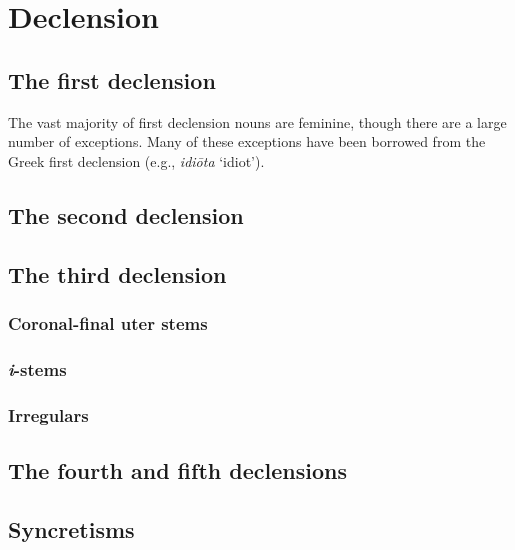 \chapter{Declension}

\section{The first declension}

The vast majority of first declension nouns are feminine, though there are a large number of exceptions. Many of these exceptions have been borrowed from the Greek first declension (e.g., \emph{idiōta} `idiot'). 



\section{The second declension}


\section{The third declension}

\subsection{Coronal-final uter stems}

\subsection{\emph{i}-stems}

\subsection{Irregulars}

\section{The fourth and fifth declensions}

\section{Syncretisms}
